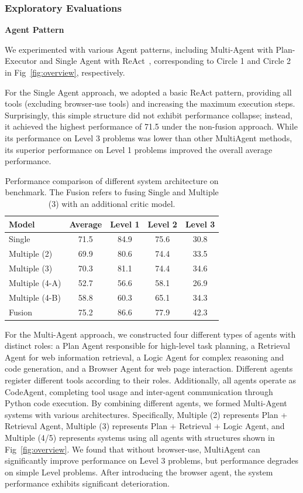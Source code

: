 \subsubsection{Exploratory Evaluations}
\noindent \textbf{Agent Pattern}

We experimented with various Agent patterns, including Multi-Agent with Plan-Executor and Single Agent with ReAct~\cite{yao2023react}, corresponding to Circle 1 and Circle 2 in Fig~\ref{fig:overview}, respectively.

For the Single Agent approach, we adopted a basic ReAct pattern, providing all tools (excluding browser-use tools) and increasing the maximum execution steps. Surprisingly, this simple structure did not exhibit performance collapse; instead, it achieved the highest performance of 71.5 under the non-fusion approach. While its performance on Level 3 problems was lower than other MultiAgent methods, its superior performance on Level 1 problems improved the overall average performance.

\begin{table}[!h]
\centering%
{}
\caption{Performance comparison of different system architecture on \gaia{} benchmark. The Fusion refers to fusing Single and Multiple (3) with an additional critic model.}
\label{tab:pattern}
\vspace{-9pt}
\begin{tabular}{l|cccc}
\toprule
Model & Average & Level 1 & Level 2 & Level 3  \\
\midrule
Single       & 71.5 & 84.9 & 75.6 & 30.8 \\
Multiple (2) & 69.9 & 80.6 & 74.4 & 33.5 \\
Multiple (3) & 70.3 & 81.1 & 74.4 & 34.6 \\
Multiple (4-A)& 52.7 & 56.6 & 58.1 & 26.9 \\
Multiple (4-B)& 58.8 & 60.3 & 65.1 & 34.3 \\
Fusion & 75.2 & 86.6 & 77.9 & 42.3 \\
\bottomrule
\end{tabular}
\end{table}


For the Multi-Agent approach, we constructed four different types of agents with distinct roles: a Plan Agent responsible for high-level task planning, a Retrieval Agent for web information retrieval, a Logic Agent for complex reasoning and code generation, and a Browser Agent for web page interaction. Different agents register different tools according to their roles. Additionally, all agents operate as CodeAgent, completing tool usage and inter-agent communication through Python code execution. By combining different agents, we formed Multi-Agent systems with various architectures. Specifically, Multiple (2) represents Plan + Retrieval Agent, Multiple (3) represents Plan + Retrieval + Logic Agent, and Multiple (4/5) represents systems using all agents with structures shown in Fig~\ref{fig:overview}. We found that without browser-use, MultiAgent can significantly improve performance on Level 3 problems, but performance degrades on simple Level problems. After introducing the browser agent, the system performance exhibits significant deterioration.

